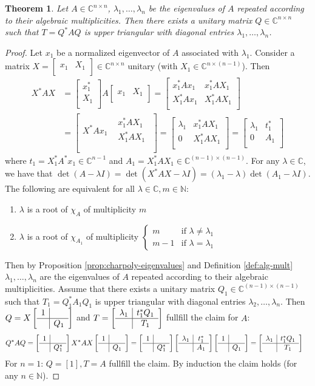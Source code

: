 \documentclass[12pt]{article}
\newcounter{lecture}
\newtheorem{theorem}{Theorem}[lecture]
\theoremstyle{definition}
\theoremstyle{remark}
\numberwithin{equation}{section}
\newcommand{\C}{\mathbb{C}}
\newcommand{\N}{\mathbb{N}}
\newcommand{\blockHorizontal}[2]{
  \left[
    \begin{array}{c|c}
      #1 & #2 \\
    \end{array}
  \right]
}
\newcommand{\blockVertical}[2]{
  \left[
    \begin{array}{c}
      #1\\\hline
      #2\\
    \end{array}
  \right]
}
\newcommand{\blockFull}[4]{
  \left[
    \begin{array}{c|c}
      #1 & #2\\\hline
      #3 & #4\\
    \end{array}
  \right]
}
\begin{document}
\begin{theorem}
  \label{thm:schur-decomposition}
  Let $A \in \C^{n \times n}$, $\lambda_1,\ldots,\lambda_n$ be the eigenvalues of $A$ repeated according to their algebraic multiplicities. Then there exists a unitary matrix $Q \in \C^{n \times n}$ such that $T = Q^*AQ$ is upper triangular with diagonal entries $\lambda_1,\ldots,\lambda_n$.
\end{theorem}
\begin{proof}
  Let $x_1$ be a normalized eigenvector of $A$ associated with $\lambda_1$. Consider a matrix $X=\blockHorizontal{x_1}{X_1} \in \C^{n\times n}$ unitary (with $X_1 \in \C^{n \times (n-1)}$). Then
  \begin{align*}
    X^*AX &= \blockVertical{x_1^*}{X_1} A \blockHorizontal{x_1}{X_1} = \blockFull{x_1^* A x_1}{x_1^* A X_1}{X_1^* A x_1}{X_1^* A X_1}\\
    &=\left[
      \begin{array}{c|c}
        X^*Ax_1 &
        \begin{array}{c}x_1^* A X_1 \\ X_1^* A X_1 \\
        \end{array}\\
    \end{array}\right] = \blockFull{\lambda_1}{x_1^*AX_1}{0}{X_1^*AX_1} = \blockFull{\lambda_1}{t_1^*}{0}{A_1}
  \end{align*}
  where $t_1=X_1^*A^*x_1 \in \C^{n-1}$ and $A_1 = X_1^*AX_1 \in \C^{(n-1)\times(n-1)}$. For any $\lambda \in \C$, we have that $\det(A-\lambda I) = \det(X^*AX - \lambda I) = (\lambda_1 - \lambda) \det(A_1 - \lambda I)$. The following are equivalent for all $\lambda \in \C, m \in \N$:
  \begin{enumerate}[label=(\roman*)]
    \item $\lambda$ is a root of $\chi_A$ of multiplicity $m$
    \item $\lambda$ is a root of $\chi_{A_1}$ of multiplicity $
      \begin{cases}
        m & \text{if } \lambda \neq \lambda_1\\
        m-1 & \text{if } \lambda = \lambda_1
      \end{cases}$
  \end{enumerate}
  Then by Proposition \ref{prop:charpoly-eigenvalues} and Definition \ref{def:alg-mult} $\lambda_1, \ldots, \lambda_n$ are the eigenvalues of $A$ repeated according to their algebraic multiplicities. Assume that there exists a unitary matrix $Q_1 \in \C^{(n-1)\times(n-1)}$ such that $T_1 = Q_1^*A_1Q_1$ is upper triangular with diagonal entries $\lambda_2,\ldots,\lambda_n$. Then $Q = X \blockFull{1}{}{}{Q_1}$ and $T = \blockFull{\lambda_1}{t_1^*Q_1}{}{T_1}$ fullfill the claim for $A$:
  \begin{align*}
    Q^*AQ &= \blockFull{1}{}{}{Q_1^*} X^*AX \blockFull{1}{}{}{Q_1} = \blockFull{1}{}{}{Q_1^*} \blockFull{\lambda_1}{t_1^*}{}{A_1} \blockFull{1}{}{}{Q_1} = \blockFull{\lambda_1}{t_1^*Q_1}{}{T_1}
  \end{align*}
  For $n=1$: $Q=[1], T = A $ fullfill the claim. By induction the claim holds (for any $n\in \N$).
\end{proof}
\end{document}
